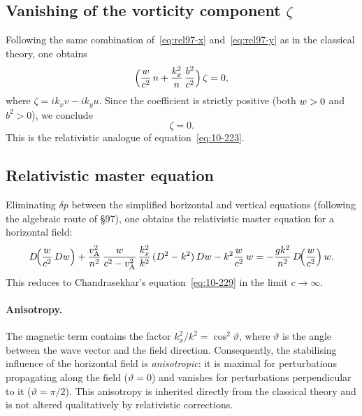 \subsection{Vanishing of the vorticity component $\zeta$}

Following the same combination of~\eqref{eq:rel97-x}
and~\eqref{eq:rel97-y} as in the classical theory, one obtains
\begin{equation}
  \Bigl(\frac{w}{c^{2}}\,n
    + \frac{k_{x}^{2}}{n}\,\frac{b^{2}}{c^{2}}\Bigr)\,\zeta = 0,
  \label{eq:rel97-zeta-eq}
\end{equation}
where $\zeta = ik_{x}v - ik_{y}u$.  Since the coefficient is strictly
positive (both $w>0$ and $b^{2}>0$), we conclude
\begin{equation}
  \zeta = 0.
  \label{eq:rel97-zeta-zero}
\end{equation}
This is the relativistic analogue of equation~\eqref{eq:10-223}.

\subsection{Relativistic master equation}

Eliminating $\delta p$ between the simplified horizontal and vertical
equations (following the algebraic route of
\S97), one obtains the relativistic master equation for a horizontal
field:
\begin{equation}
  D\!\Bigl(\frac{w}{c^{2}}\,Dw\Bigr)
    + \frac{v_{\mathrm{A}}^{2}}{n^{2}}\,\frac{w}{c^{2}-v_{\mathrm{A}}^{2}}
      \,\frac{k_{x}^{2}}{k^{2}}
      \,(D^{2}-k^{2})\,Dw
    - k^{2}\frac{w}{c^{2}}\,w
    = -\frac{gk^{2}}{n^{2}}\,
      D\!\Bigl(\frac{w}{c^{2}}\Bigr)\,w.
  \label{eq:rel97-master}
\end{equation}
This reduces to Chandrasekhar's equation~\eqref{eq:10-229} in the limit
$c\to\infty$.

\paragraph{Anisotropy.}
The magnetic term contains the factor $k_{x}^{2}/k^{2}=\cos^{2}\vartheta$,
where $\vartheta$ is the angle between the wave vector and the field
direction.  Consequently, the stabilising influence of the horizontal
field is \emph{anisotropic}: it is maximal for perturbations propagating
along the field ($\vartheta=0$) and vanishes for perturbations
perpendicular to it ($\vartheta=\pi/2$).  This anisotropy is inherited
directly from the classical theory and is not altered qualitatively by
relativistic corrections.

